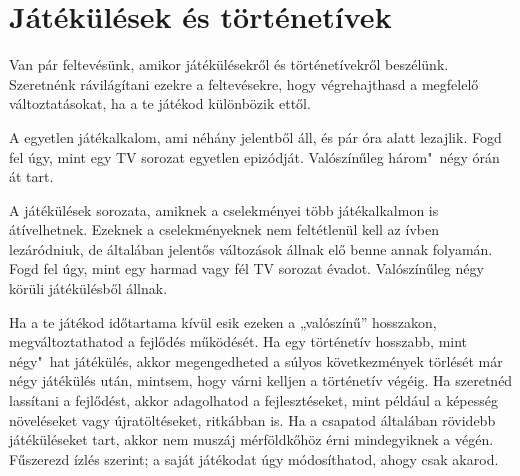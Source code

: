 \section{Játékülések és történetívek}

Van pár feltevésünk, amikor játékülésekről és történetívekről beszélünk. Szeretnénk rávilágítani ezekre a feltevésekre, hogy végrehajthasd a megfelelő változtatásokat, ha a te játékod különbözik ettől.

A  egyetlen játékalkalom, ami néhány jelentből áll, és pár óra alatt lezajlik. Fogd fel úgy, mint egy TV sorozat egyetlen epizódját. Valószínűleg három"~négy órán át tart.

A  játékülések sorozata, amiknek a cselekményei több játékalkalmon is átívelhetnek. Ezeknek a cselekményeknek nem feltétlenül kell az ívben lezáródniuk, de általában jelentős változások állnak elő benne annak folyamán. Fogd fel úgy, mint egy harmad vagy fél TV sorozat évadot. Valószínűleg négy körüli játékülésből állnak.

Ha a te játékod időtartama kívül esik ezeken a „valószínű” hosszakon, megváltoztathatod a fejlődés működését.  Ha egy történetív hosszabb, mint négy"~hat játékülés, akkor megengedheted a súlyos következmények törlését már négy játékülés után, mintsem, hogy várni kelljen a történetív végéig. Ha szeretnéd lassítani a fejlődést, akkor adagolhatod a fejlesztéseket, mint például a képesség növeléseket vagy újratöltéseket, ritkábban is. Ha a csapatod általában rövidebb játéküléseket tart, akkor nem muszáj mérföldkőhöz érni mindegyiknek a végén. Fűszerezd ízlés szerint; a saját játékodat úgy módosíthatod, ahogy csak akarod.
